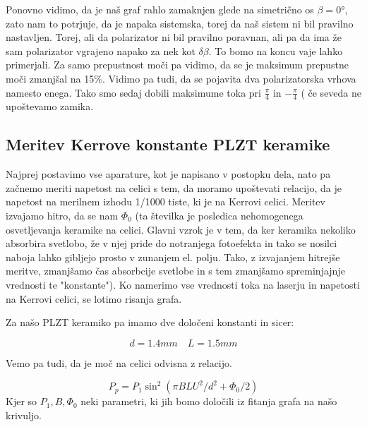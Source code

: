 \documentclass[11pt, a4paper]{article}
\theoremstyle{definition}
\theoremstyle{example}
\theoremstyle{izrek}
\begin{document}
Ponovno vidimo, da je naš graf rahlo zamaknjen glede na simetrično os $\beta=0°$, zato nam to potrjuje, da je napaka sistemska, torej da naš sistem ni bil pravilno nastavljen. Torej, ali da polarizator ni bil pravilno poravnan, ali pa da ima že sam polarizator vgrajeno napako za nek kot $\delta \beta$. To bomo na koncu vaje lahko primerjali. 
Za samo prepustnost moči pa vidimo, da se je maksimum prepustne moči zmanjšal na 15\%. Vidimo pa tudi, da se pojavita dva polarizatorska vrhova namesto enega. Tako smo sedaj dobili maksimume toka pri $\frac{\pi}{4}$ in $-\frac{\pi}{4}$ ( če seveda ne upoštevamo zamika.

\subsection{Meritev Kerrove konstante PLZT keramike}
Najprej postavimo vse aparature, kot je napisano v postopku dela, nato pa začnemo meriti napetost na celici s tem, da moramo upoštevati relacijo, da je napetost na merilnem izhodu 1/1000 tiste, ki je na Kerrovi celici. Meritev izvajamo hitro, da se nam $\Phi_0$ (ta številka je posledica nehomogenega osvetljevanja keramike na celici. Glavni vzrok je v tem, da ker keramika nekoliko absorbira svetlobo, že v njej pride do notranjega fotoefekta in tako se nosilci naboja lahko gibljejo prosto v zunanjem el. polju. Tako, z izvajanjem hitrejše meritve, zmanjšamo čas absorbcije svetlobe in s tem zmanjšamo spreminjajnje vrednosti te "konstante").
Ko namerimo vse vrednosti toka na laserju in napetosti na Kerrovi celici, se lotimo risanja grafa. 

Za našo PLZT keramiko pa imamo dve določeni konstanti in sicer:

\begin{equation}
\label{Razmik in debelina med ploskvama}
d=1.4 mm \quad L=1.5 mm
\end{equation}

Vemo pa tudi, da je moč na celici odvisna z relacijo. 

\begin{equation}
P_{p}=P_{1} \sin ^{2}\left(\pi B L U^{2} / d^{2}+\Phi_{0} / 2\right)
\label{Kerrova konstanta}
\end{equation}
Kjer so $P_1, B, \Phi_{0}$ neki parametri, ki jih bomo določili iz fitanja grafa na našo krivuljo.
\end{document}
